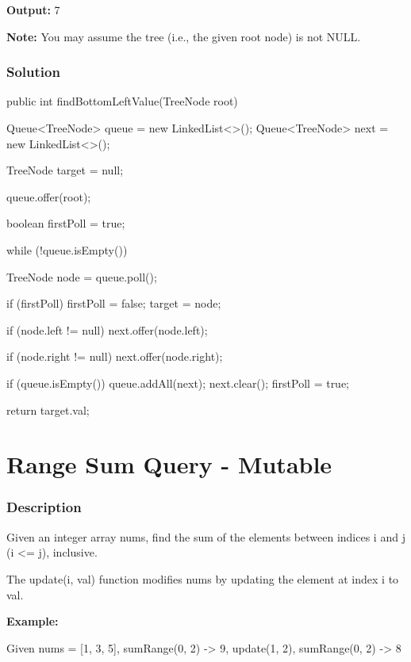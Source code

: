 \textbf{Output:} 7

\textbf{Note:} You may assume the tree (i.e., the given root node) is not NULL.

\newpage

\subsubsection{Solution}

\begin{Code}
public int findBottomLeftValue(TreeNode root) {
    Queue<TreeNode> queue = new LinkedList<>();
    Queue<TreeNode> next = new LinkedList<>();

    TreeNode target = null;

    queue.offer(root);

    boolean firstPoll = true;

    while (!queue.isEmpty()) {
        TreeNode node = queue.poll();

        if (firstPoll) {
            firstPoll = false;
            target = node;
        }

        if (node.left != null) {
            next.offer(node.left);
        }

        if (node.right != null) {
            next.offer(node.right);
        }

        if (queue.isEmpty()) {
            queue.addAll(next);
            next.clear();
            firstPoll = true;
        }
    }

    return target.val;
}
\end{Code}

\newpage

\section{Range Sum Query - Mutable} %

\subsubsection{Description}
Given an integer array nums, find the sum of the elements between indices i and j (i <= j), inclusive.

The update(i, val) function modifies nums by updating the element at index i to val.

\textbf{Example:}

Given nums = [1, 3, 5], sumRange(0, 2) -> 9, update(1, 2), sumRange(0, 2) -> 8

